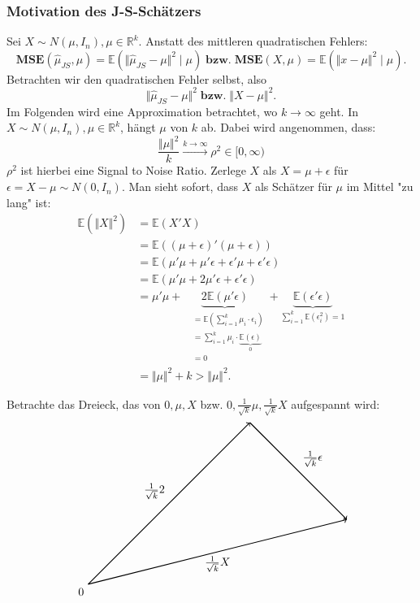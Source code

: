 \documentclass[10pt]{article}
\newcommand{\IR}{\mathbb{R}} %
\newcommand{\EW}{\mathbb{E}} %
\newcommand{\MSE}{\textbf{MSE}} %
\newcommand{\JSEM}{\hat{\mu}_{JS}} %
\begin{document}
	\subsubsection{Motivation des J-S-Schätzers}
	Sei $X \sim N(\mu, I_n), \mu \in \IR^k$. Anstatt des mittleren quadratischen Fehlers:
	\begin{equation*}
		\MSE(\hat{\mu}_{JS}, \mu) = \EW(\Vert \JSEM - \mu \Vert^2 \mid \mu) \; \textbf{bzw.} \; \MSE(X, \mu) = \EW( \Vert x - \mu \Vert^2 \mid \mu).
	\end{equation*}
	Betrachten wir den quadratischen Fehler selbst, also
	\begin{equation*}
		\Vert \JSEM - \mu \Vert^2 \; \textbf{bzw.} \; \Vert X - \mu \Vert^2.
	\end{equation*}
	Im Folgenden wird eine Approximation betrachtet, wo $k \rightarrow \infty$ geht. In $X \sim N(\mu, I_n), \mu \in \IR^k$, hängt $\mu$ von $k$ ab. Dabei wird angenommen, dass:
	\begin{equation*}
		\frac{\Vert \mu \Vert^2}{k} \overset{k \rightarrow \infty}{\longrightarrow} \rho^2 \in [0, \infty)
	\end{equation*}
	$\rho^2$ ist hierbei eine Signal to Noise Ratio.
	Zerlege $X$ als $X = \mu + \epsilon$ für $\epsilon = X- \mu \sim N(0, I_n)$.
	Man sieht sofort, dass $X$ als Schätzer für $\mu$ im Mittel "zu lang" ist:
	\begin{equation*}
		\begin{split}
			\EW(\Vert X \Vert^2) &= \EW(X'X) \\
			&= \EW((\mu + \epsilon)'(\mu + \epsilon)) \\
			&= \EW(\mu' \mu + \mu' \epsilon + \epsilon' \mu + \epsilon' \epsilon) \\
			&= \EW(\mu'\mu + 2\mu'\epsilon + \epsilon'\epsilon)\\
			&= \mu' \mu + \underbrace{2\EW(\mu'\epsilon)}_{\begin{split}
					&= \EW(\sum_{i=1}^{k} \mu_i \cdot \epsilon_i)\\
					&= \sum_{i = 1}^{k} \mu_i \cdot \underbrace{\EW(\epsilon)}_{0}\\
					&=0
				\end{split}} + \underbrace{\EW(\epsilon' \epsilon)}_{\sum_{i=1}^{k}\EW(\epsilon_i^2)=1}\\
			&= \Vert \mu \Vert^2 +k > \Vert \mu \Vert^2.
		\end{split}
	\end{equation*}
	
	Betrachte das Dreieck, das von $0, \mu, X$ bzw. $0, \frac{1}{\sqrt{k}} \mu, \frac{1}{\sqrt{k}} X$ aufgespannt wird:
	\begin{align*}
			\begin{tikzpicture}
			\draw[thick, ->] (0,0) node[below left] {0} -- node[midway, above left] {$\frac{1}{\sqrt{k}}\mu$} (5,5);
			\draw[thick, ->] (5,5) -- node[midway, above right] {$\frac{1}{\sqrt{k}}\epsilon$} (8,2);
			\draw[thick, ->] (0,0) -- node[midway, below] {$\frac{1}{\sqrt{k}}X$} (8,2);
		\end{tikzpicture}
	\end{align*}	
	
\end{document}
